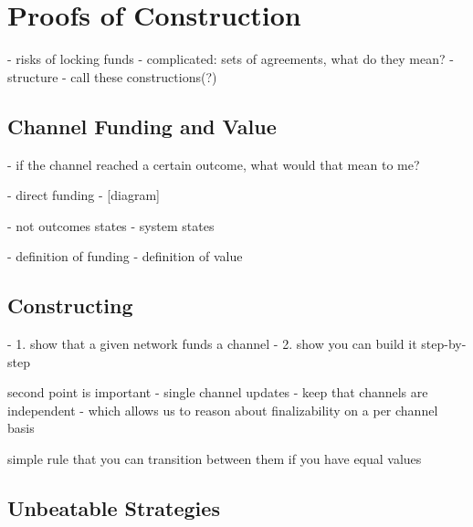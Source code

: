 \section{Proofs of Construction}\label{sec:reasoning}

- risks of locking funds
- complicated: sets of agreements, what do they mean?
- structure - call these constructions(?)

\subsection{Channel Funding and Value}

- if the channel reached a certain outcome, what would that mean to me?

\begin{figure}[h]\centering
  \makebox[\textwidth][c]{}
  \caption{
  }\label{fig:meaning-of-funding}
\end{figure}
- direct funding
- [diagram]

\begin{figure}[h]\centering
  \makebox[\textwidth][c]{}
  \caption{
  }\label{fig:direct-funding}
\end{figure}

- not outcomes states
- system states

\begin{figure}[h]\centering
  \makebox[\textwidth][c]{}
  \caption{
  }\label{fig:system-state-direct-funding}
\end{figure}

- definition of funding
- definition of value

\subsection{Constructing}

- 1. show that a given network funds a channel
- 2. show you can build it step-by-step

second point is important
- single channel updates
- keep that channels are independent - which allows us to reason about finalizability on a per channel basis

simple rule that you can transition between them if you have equal values

\subsection{Unbeatable Strategies}

